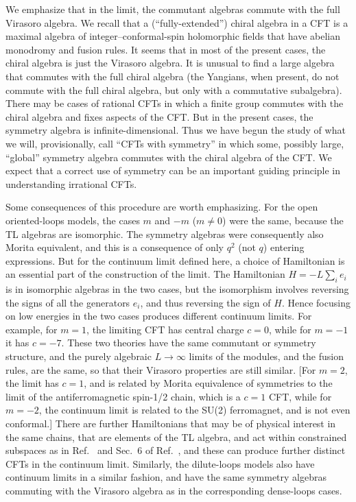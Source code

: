 \documentclass[twocolumn,floats,pra]{revtex4}
\begin{document}
We emphasize that in the limit, the commutant algebras commute
with the full Virasoro algebra. We recall that a
(``fully-extended'') chiral algebra in a CFT is a maximal algebra
of integer--conformal-spin holomorphic fields that have abelian
monodromy and fusion rules. It seems that in most of the present
cases, the chiral algebra is just the Virasoro algebra. It is
unusual to find a large algebra that commutes with the full chiral
algebra (the Yangians, when present, do not commute with the full
chiral algebra, but only with a commutative subalgebra). There may
be cases of rational CFTs in which a finite group commutes with
the chiral algebra and fixes aspects of the CFT. But in the
present cases, the symmetry algebra is infinite-dimensional. Thus
we have begun the study of what we will, provisionally, call
``CFTs with symmetry'' in which some, possibly large, ``global''
symmetry algebra commutes with the chiral algebra of the CFT. We
expect that a correct use of symmetry can be an important guiding
principle in understanding irrational CFTs.

Some consequences of this procedure are worth emphasizing. For the
open oriented-loops models, the cases $m$ and $-m$ ($m\neq0$) were
the same, because the TL algebras are isomorphic. The symmetry
algebras were consequently also Morita equivalent, and this is a
consequence of only $q^2$ (not $q$) entering expressions. But for
the continuum limit defined here, a choice of Hamiltonian is an
essential part of the construction of the limit. The Hamiltonian
$H = -L\sum_i e_i$ is in isomorphic algebras in the two cases, but
the isomorphism involves reversing the signs of all the generators
$e_i$, and thus reversing the sign of $H$. Hence focusing on low
energies in the two cases produces different continuum limits. For
example, for $m=1$, the limiting CFT has central charge $c=0$,
while for $m=-1$ it has $c=-7$. These two theories have the same
commutant or symmetry structure, and the purely algebraic
$L\to\infty$ limits of the modules, and the fusion rules, are the
same, so that their Virasoro properties are still similar. [For
$m=2$, the limit has $c=1$, and is related by Morita equivalence
of symmetries to the limit of the antiferromagnetic spin-1/2
chain, which is a $c=1$ CFT, while for $m=-2$, the continuum limit
is related to the SU(2) ferromagnet, and is not even conformal.]
There are further Hamiltonians that may be of physical interest in
the same chains, that are elements of the TL algebra, and act
within constrained subspaces as in Ref.\ \cite{ks2} and Sec.\ 6 of
Ref.\ \cite{fr}, and these can produce further distinct CFTs in
the continuum limit. Similarly, the dilute-loops models also have
continuum limits in a similar fashion, and have the same symmetry
algebras commuting with the Virasoro algebra as in the
corresponding dense-loops cases.
\end{document}
